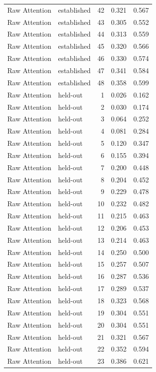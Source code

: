 \begin{tabular}{llrrr}
Raw Attention & established & 42 & 0.321 & 0.567 \\
Raw Attention & established & 43 & 0.305 & 0.552 \\
Raw Attention & established & 44 & 0.313 & 0.559 \\
Raw Attention & established & 45 & 0.320 & 0.566 \\
Raw Attention & established & 46 & 0.330 & 0.574 \\
Raw Attention & established & 47 & 0.341 & 0.584 \\
Raw Attention & established & 48 & 0.358 & 0.599 \\
Raw Attention & held-out & 1 & 0.026 & 0.162 \\
Raw Attention & held-out & 2 & 0.030 & 0.174 \\
Raw Attention & held-out & 3 & 0.064 & 0.252 \\
Raw Attention & held-out & 4 & 0.081 & 0.284 \\
Raw Attention & held-out & 5 & 0.120 & 0.347 \\
Raw Attention & held-out & 6 & 0.155 & 0.394 \\
Raw Attention & held-out & 7 & 0.200 & 0.448 \\
Raw Attention & held-out & 8 & 0.204 & 0.452 \\
Raw Attention & held-out & 9 & 0.229 & 0.478 \\
Raw Attention & held-out & 10 & 0.232 & 0.482 \\
Raw Attention & held-out & 11 & 0.215 & 0.463 \\
Raw Attention & held-out & 12 & 0.206 & 0.453 \\
Raw Attention & held-out & 13 & 0.214 & 0.463 \\
Raw Attention & held-out & 14 & 0.250 & 0.500 \\
Raw Attention & held-out & 15 & 0.257 & 0.507 \\
Raw Attention & held-out & 16 & 0.287 & 0.536 \\
Raw Attention & held-out & 17 & 0.289 & 0.537 \\
Raw Attention & held-out & 18 & 0.323 & 0.568 \\
Raw Attention & held-out & 19 & 0.304 & 0.551 \\
Raw Attention & held-out & 20 & 0.304 & 0.551 \\
Raw Attention & held-out & 21 & 0.321 & 0.567 \\
Raw Attention & held-out & 22 & 0.352 & 0.594 \\
Raw Attention & held-out & 23 & 0.386 & 0.621 \\

\end{tabular}
